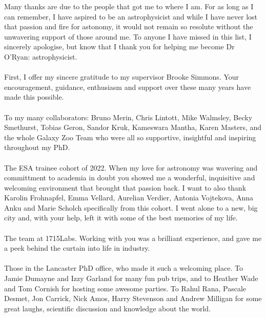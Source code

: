 

\begin{acknowledgements}      %
Many thanks are due to the people that got me to where I am. For as long as I can remember, I have aspired to be an astrophysicist and while I have never lost that passion and fire for astonomy, it would not remain so resolute without the unwavering support of those around me. To anyone I have missed in this list, I sincerely apologise, but know that I thank you for helping me become Dr O'Ryan: astrophysicist.
\\
\\
First, I offer my sincere gratitude to my supervisor Brooke Simmons. Your encouragement, guidance, enthusiasm and support over these many years have made this possible.
\\
\\
To my many collaborators: Bruno Merin, Chris Lintott, Mike Walmsley, Becky Smethurst, Tobias Geron, Sandor Kruk, Kameswara Mantha, Karen Masters, and the whole Galaxy Zoo Team who were all so supportive, insightful and inspiring throughout my PhD. 
\\
\\
The ESA trainee cohort of 2022. When my love for astronomy was wavering and committment to academia in doubt you showed me a wonderful, inquisitive and welcoming environment that brought that passion back. I want to also thank Karolin Frohnapfel, Emma Vellard, Aurelian Verdier, Antonia Vojtekova, Anna Anku and Marie Scholch specifically from this cohort. I went alone to a new, big city and, with your help, left it with some of the best memories of my life.  
\\
\\
The team at 1715Labs. Working with you was a brilliant experience, and gave me a peek behind the curtain into life in industry.
\\
\\
Those in the Lancaster PhD office, who made it such a welcoming place. To Jamie Dumayne and Izzy Garland for many fun pub trips, and to Heather Wade and Tom Cornish for hosting some awesome parties. To Rahul Rana, Pascale Desmet, Jon Carrick, Nick Amos, Harry Stevenson and Andrew Milligan for some great laughs, scientific discussion and knowledge about the world.

\end{acknowledgements}
